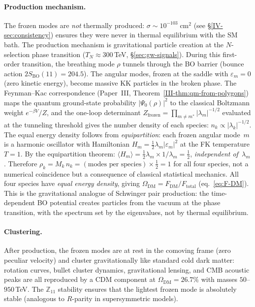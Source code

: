 \paragraph{Production mechanism.}
The frozen modes are \emph{not} thermally produced:
$\sigma \sim 10^{-103}\;\mathrm{cm}^2$ (see
\S\ref*{IV-sec:consistency}) ensures they were never in
thermal equilibrium with the SM bath.
The production mechanism is gravitational particle creation
at the $N$-selection phase transition
($T_N \approx 300$\,TeV, \S\ref{sec:gw-signals}).
During this first-order transition, the breathing mode
$\rho$ tunnels through the BO barrier (bounce action
$2S_{\mathrm{BO}}(11) = 204.5$).
The angular modes, frozen at the saddle with
$\varepsilon_m = 0$ (zero kinetic energy),
become massive KK particles in the broken phase.
The Feynman--Kac correspondence
(Paper~III, Theorem~\ref{III-thm:qm-from-polygons})
maps the quantum ground-state probability $|\Psi_0(\rho)|^2$
to the classical Boltzmann weight $e^{-\beta V}/Z$,
and the one-loop determinant
$Z_{\mathrm{frozen}} = \prod_{m \ne m^*}|\lambda_m|^{-1/2}$
evaluated at the tunneling threshold gives the
number density of each species:
$n_k \propto |\lambda_k|^{-1/2}$.
The equal energy density follows from \emph{equipartition}:
each frozen angular mode~$m$ is a harmonic oscillator
with Hamiltonian $H_m = \tfrac{1}{2}\lambda_m|\varepsilon_m|^2$
at the FK temperature $T = 1$.
By the equipartition theorem:
$\langle H_m\rangle
= \tfrac{1}{2}\lambda_m \times 1/\lambda_m = \tfrac{1}{2}$,
\emph{independent of~$\lambda_m$}.
Therefore $\rho_k = M_k\,n_k
= (\text{modes per species}) \times \tfrac{1}{2} = 1$
for all four species, not a numerical coincidence but a
consequence of classical statistical mechanics.
All four species have \emph{equal energy density},
giving
$\Omega_{\mathrm{DM}} = F_{\mathrm{DM}} / F_{\mathrm{total}}$
(eq.~\ref{eq:F-DM}).
This is the gravitational analogue of Schwinger pair
production: the time-dependent BO potential creates
particles from the vacuum at the phase transition,
with the spectrum set by the eigenvalues, not by
thermal equilibrium.

\paragraph{Clustering.}
After production, the frozen modes are at rest in the
comoving frame (zero peculiar velocity) and cluster
gravitationally like standard cold dark matter:
rotation curves, bullet cluster dynamics, gravitational
lensing, and CMB acoustic peaks are all reproduced by
a CDM component at
$\Omega_{\mathrm{DM}} = 26.7\%$ with masses
$50$--$950$\,TeV.
The $\mathbb{Z}_{11}$ stability ensures that the
lightest frozen mode is absolutely stable (analogous to
$R$-parity in supersymmetric models).


